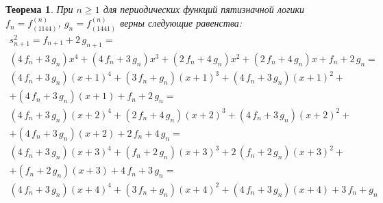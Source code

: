 \documentclass[bibliography=totoc, a4paper, 14pt]{extarticle}
\newtheorem{myth}{Теорема}
\begin{document}
\begin{myth} При $n \geqslant 1 $ для периодических функций пятизначной логики $f_n = f^{\left(n\right)}_{\left(1144\right)}$,
$g_n = f^{\left(n\right)}_{\left(1441\right)}$ верны следующие равенства:
$$\begin{array}{l}
s_{n+1}^2 = f_{n+1} + 2\,g_{n+1}=\\
 {\left(4 \, f_{n} + 3 \, g_{n}\right)} x^{4} + {\left(4 \, f_{n} + 3 \, g_{n}\right)} x^{3} + {\left(2 \, f_{n} + 4 \, g_{n}\right)} x^{2} + {\left(2 \, f_{n} + 4 \, g_{n}\right)} x + f_{n} + 2 \, g_{n} =\\
 {\left(4 \, f_{n} + 3 \, g_{n}\right)} {\left(x + 1\right)}^{4} + {\left(3 \, f_{n} + g_{n}\right)} {\left(x + 1\right)}^{3} + {\left(4 \, f_{n} + 3 \, g_{n}\right)} {\left(x + 1\right)}^{2} +\\
 + {\left(4 \, f_{n} + 3 \, g_{n}\right)} {\left(x + 1\right)} + f_{n} + 2 \, g_{n} =\\
 {\left(4 \, f_{n} + 3 \, g_{n}\right)} {\left(x + 2\right)}^{4} + {\left(2 \, f_{n} + 4 \, g_{n}\right)} {\left(x + 2\right)}^{3} + {\left(4 \, f_{n} + 3 \, g_{n}\right)} {\left(x + 2\right)}^{2} +\\
 + {\left(4 \, f_{n} + 3 \, g_{n}\right)} {\left(x + 2\right)} + 2 \, f_{n} + 4 \, g_{n} =\\
 {\left(4 \, f_{n} + 3 \, g_{n}\right)} {\left(x + 3\right)}^{4} + {\left(f_{n} + 2 \, g_{n}\right)} {\left(x + 3\right)}^{3} + 2 \, {\left(f_{n} + 2 \, g_{n}\right)} {\left(x + 3\right)}^{2} +\\
 + {\left(f_{n} + 2 \, g_{n}\right)} {\left(x + 3\right)} + 4 \, f_{n} + 3 \, g_{n} =\\
 {\left(4 \, f_{n} + 3 \, g_{n}\right)} {\left(x + 4\right)}^{4} + {\left(3 \, f_{n} + g_{n}\right)} {\left(x + 4\right)}^{2} + {\left(4 \, f_{n} + 3 \, g_{n}\right)} {\left(x + 4\right)} + 3 \, f_{n} + g_{n} \\
 \end{array}$$
\end{myth}
\end{document}
